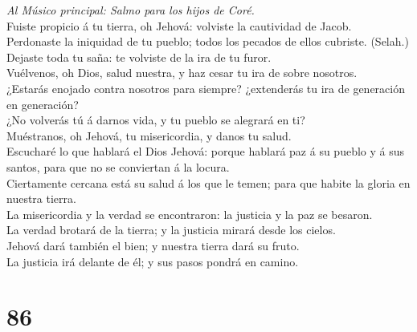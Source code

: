  \emph{Al Músico principal: Salmo para los hijos de Coré.}\\
Fuiste propicio á tu tierra, oh Jehová: volviste la cautividad de
Jacob.\\
 Perdonaste la iniquidad de tu pueblo; todos los pecados de
ellos cubriste. (Selah.)\\
 Dejaste toda tu saña: te volviste de la ira de tu furor.\\
 Vuélvenos, oh Dios, salud nuestra, y haz cesar tu ira de
sobre nosotros.\\
 ¿Estarás enojado contra nosotros para siempre? ¿extenderás
tu ira de generación en generación?\\
 ¿No volverás tú á darnos vida, y tu pueblo se alegrará en
ti?\\
 Muéstranos, oh Jehová, tu misericordia, y danos tu salud.\\
 Escucharé lo que hablará el Dios Jehová: porque hablará paz
á su pueblo y á sus santos, para que no se conviertan á la locura.\\
 Ciertamente cercana está su salud á los que le temen; para
que habite la gloria en nuestra tierra.\\
 La misericordia y la verdad se encontraron: la justicia y
la paz se besaron.\\
 La verdad brotará de la tierra; y la justicia mirará desde
los cielos.\\
 Jehová dará también el bien; y nuestra tierra dará su
fruto.\\
 La justicia irá delante de él; y sus pasos pondrá en
camino.

\hypertarget{section-85}{%
\section{86}\label{section-85}}

